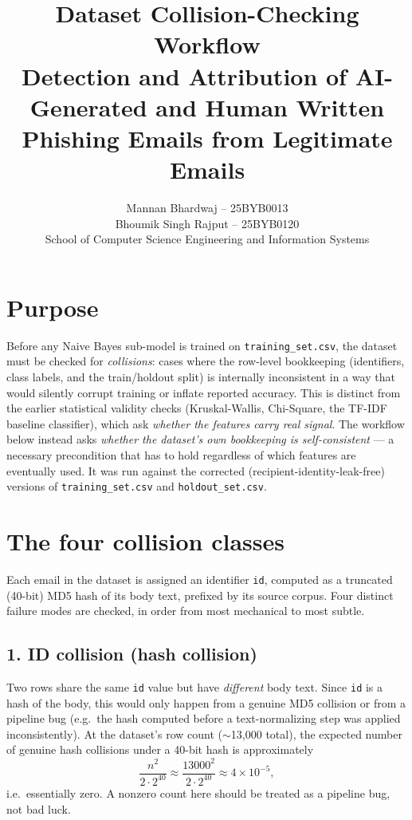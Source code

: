 \documentclass[11pt]{article}
\title{\textbf{Dataset Collision-Checking Workflow}\\[2pt]\large Detection and Attribution of AI-Generated and Human Written
Phishing Emails from Legitimate Emails}
\author{Mannan Bhardwaj -- 25BYB0013 \\ Bhoumik Singh Rajput -- 25BYB0120 \\[4pt]
School of Computer Science Engineering and Information Systems}
\date{}
\begin{document}
\maketitle

\section{Purpose}
Before any Naive Bayes sub-model is trained on \texttt{training\_set.csv}, the dataset must be checked
for \emph{collisions}: cases where the row-level bookkeeping (identifiers, class labels, and the
train/holdout split) is internally inconsistent in a way that would silently corrupt training or inflate
reported accuracy. This is distinct from the earlier statistical validity checks (Kruskal-Wallis,
Chi-Square, the TF-IDF baseline classifier), which ask \emph{whether the features carry real signal}.
The workflow below instead asks \emph{whether the dataset's own bookkeeping is self-consistent} --- a
necessary precondition that has to hold regardless of which features are eventually used. It was run
against the corrected (recipient-identity-leak-free) versions of \texttt{training\_set.csv} and
\texttt{holdout\_set.csv}.

\section{The four collision classes}
Each email in the dataset is assigned an identifier \texttt{id}, computed as a truncated (40-bit) MD5
hash of its body text, prefixed by its source corpus. Four distinct failure modes are checked, in order
from most mechanical to most subtle.

\subsection*{1. ID collision (hash collision)}
Two rows share the same \texttt{id} value but have \emph{different} body text. Since \texttt{id} is a
hash of the body, this would only happen from a genuine MD5 collision or from a pipeline bug (e.g.\ the
hash computed before a text-normalizing step was applied inconsistently). At the dataset's row count
($\sim$13{,}000 total), the expected number of genuine hash collisions under a 40-bit hash is
approximately
\[
\frac{n^2}{2 \cdot 2^{40}} \approx \frac{13000^2}{2 \cdot 2^{40}} \approx 4 \times 10^{-5},
\]
i.e.\ essentially zero. A nonzero count here should be treated as a pipeline bug, not bad luck.
\end{document}
